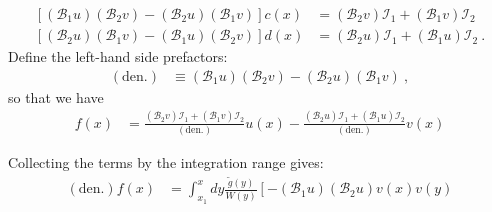 \begin{subappendices}
\begin{align}
	\left[ \left(\mathcal B_1 u\right)\left(\mathcal B_2 v\right) - \left(\mathcal B_2 u\right)\left(\mathcal B_1 v\right)  \right]
	c(x)
	&= 
	\left(\mathcal B_2 v\right)
	\mathcal{I}_1 
	+
	\left(\mathcal B_1 v\right)
	\mathcal{I}_2 
	\\
	\left[ 
		\left(\mathcal B_2 u\right)\left(\mathcal B_1 v\right) 
		- 
		\left(\mathcal B_1 u\right)\left(\mathcal B_2 v\right)  
	\right]
	d(x)
	&= 
	\left(\mathcal B_2 u\right)
	\mathcal{I}_1 
	+ 
	\left(\mathcal B_1 u\right)
	\mathcal{I}_2 
	\ .
\end{align}
Define the left-hand side prefactors:
\begin{align}
	(\text{den}.) &\equiv
	\left(\mathcal B_1 u\right)\left(\mathcal B_2 v\right) - \left(\mathcal B_2 u\right)\left(\mathcal B_1 v\right)  \ ,
\end{align}
so that we have 
\begin{align}
	f(x) &= 
	\frac{\left(\mathcal B_2 v\right)
		\mathcal{I}_1 
		+
		\left(\mathcal B_1 v\right)
		\mathcal{I}_2}{(\text{den.})}
	u(x)
	-
	\frac{\left(\mathcal B_2 u\right)
		\mathcal{I}_1 
		+
		\left(\mathcal B_1 u\right)
		\mathcal{I}_2}{(\text{den.})}
	v(x)
\end{align}
\begin{wide}
Collecting the terms by the integration range gives:
\begin{align}
	(\text{den.})f(x)&=
	\int_{x_1}^x dy \frac{\tilde g(y)}{W(y)}
	\left[
		-(\mathcal B_1u)(\mathcal B_2u) v(x)v(y)

\end{align}
\end{wide}
\end{subappendices}
